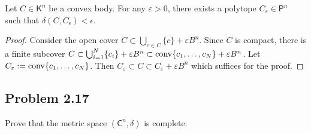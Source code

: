 \documentclass[12pt]{article}
\begin{document}
\begin{problem} \label{problem-2.16}
	Let $C \in \mathsf{K}^n$ be a convex body. For any $\varepsilon > 0$, there exists a polytope $C_\varepsilon \in \mathsf{P}^n$ such that $\delta (C, C_\epsilon) < \epsilon$.
\end{problem}

\begin{proof}
	Consider the open cover $C \subset \bigcup_{c \in C} \{c\} + \varepsilon B^n$. Since $C$ is compact, there is a finite subcover $C \subset \bigcup_{i = 1}^N \{c_i\} + \varepsilon B^n \subset \operatorname{conv} \{c_1, \ldots, c_N\} + \varepsilon B^n$. Let $C_\varepsilon := \operatorname{conv} \{c_1, \ldots, c_N\}$. Then $C_\varepsilon \subset C \subset C_\varepsilon + \varepsilon B^n$ which suffices for the proof.
\end{proof}

\newpage 

\subsection{Problem 2.17}

\begin{problem}
	Prove that the metric space $(\mathsf{C}^n, \delta)$ is complete.
\end{problem}
\end{document}
